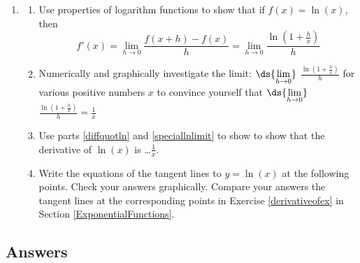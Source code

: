 \documentclass{ximera}
\begin{document}
\begin{enumerate}
\setcounter{enumi}{\value{HW}}



\item\label{derivativeofln} \begin{enumerate}  \item\label{diffquotln}  Use properties of logarithm functions to show that if $f(x) = \ln(x)$, then \[ f'(x) = \lim_{h \rightarrow 0} \frac{f(x+h) - f(x)}{h} = \lim_{h \rightarrow 0} \dfrac{\ln\left( 1 + \frac{h}{x} \right)}{h} \]

\item\label{speciallnlimit}    Numerically and graphically investigate the limit: $\ds{\lim_{h \rightarrow 0}}$ $\frac{\ln\left( 1 + \frac{h}{x} \right)}{h}$ for various positive numbers $x$ to convince yourself that   $\ds{\lim_{h \rightarrow 0}}$ $\frac{\ln\left( 1 + \frac{h}{x} \right)}{h} = \frac{1}{x}$

\item  Use parts \ref{diffquotln} and \ref{speciallnlimit} to show to show that the derivative of $\ln(x)$ is \ldots  $\frac{1}{x}$.

\item  Write the equations of the tangent lines to $y = \ln(x) $ at the following points.   Check your answers graphically.  Compare your answers the tangent lines at the corresponding points in Exercise \ref{derivativeofex} in Section \ref{ExponentialFunctions}.


\begin{enumerate}


\end{enumerate}

\end{enumerate}

\setcounter{HW}{\value{enumi}}
\end{enumerate}




\newpage

\subsection{Answers}
\end{document}
